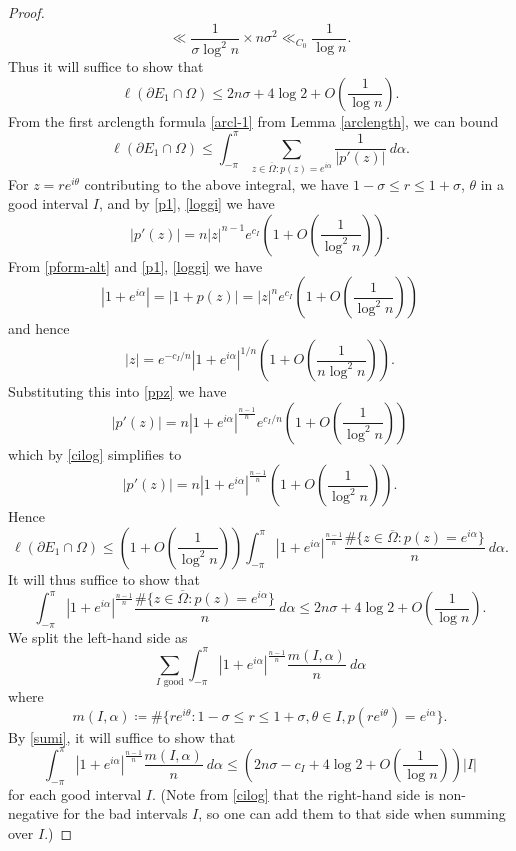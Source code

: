 \documentclass[12pt]{amsart}
\begin{document}
\begin{proof}
$$\ll  \frac{1}{\sigma \log^2 n} \times n \sigma^2 \ll_{C_0} \frac{1}{\log n}.$$
Thus it will suffice to show that
$$ \ell(\partial E_1 \cap \Omega) \leq 2n \sigma + 4 \log 2 + O\left(\frac{1}{\log n} \right).$$
From the first arclength formula \eqref{arcl-1} from Lemma \ref{arclength}, we can bound
$$ \ell(\partial E_1 \cap \Omega) \leq \int_{-\pi}^{\pi} \sum_{z \in \overline{\Omega}: p(z) = e^{i\alpha}} \frac{1}{|p'(z)|} \ d\alpha.$$
For $z = re^{i\theta}$ contributing to the above integral, we have $1-\sigma \leq r \leq 1+\sigma$, $\theta$ in a good interval $I$, and by \eqref{p1}, \eqref{loggi} we have
\begin{equation}\label{ppz}
 |p'(z)| = n |z|^{n-1} e^{c_I} \left( 1 + O\left( \frac{1}{\log^2 n} \right) \right).
\end{equation}
From \eqref{pform-alt} and \eqref{p1}, \eqref{loggi} we have
$$ |1+e^{i\alpha}| = |1+p(z)| = |z|^n e^{c_I} \left( 1 + O\left( \frac{1}{\log^2 n} \right) \right)$$
and hence
\begin{equation}\label{zi}
 |z| = e^{-c_I/n} |1 + e^{i\alpha}|^{1/n} \left( 1 + O\left( \frac{1}{n \log^2 n} \right) \right).
\end{equation}
Substituting this into \eqref{ppz} we have
$$ |p'(z)| = n |1 + e^{i\alpha}|^{\frac{n-1}{n}} e^{c_I/n} \left( 1 + O\left( \frac{1}{\log^2 n} \right) \right)$$
which by \eqref{cilog} simplifies to
$$ |p'(z)| = n |1 + e^{i\alpha}|^{\frac{n-1}{n}} \left( 1 + O\left( \frac{1}{\log^2 n} \right) \right).$$
Hence
$$ \ell(\partial E_1 \cap \Omega) \leq \left(1 + O\left( \frac{1}{\log^2 n} \right)\right) \int_{-\pi}^{\pi} |1 + e^{i\alpha}|^{\frac{n-1}{n}} \frac{\# \{ z \in \overline{\Omega}: p(z) = e^{i\alpha} \}}{n} \ d\alpha.$$
It will thus suffice to show that
$$ \int_{-\pi}^{\pi} |1 + e^{i\alpha}|^{\frac{n-1}{n}} \frac{\# \{ z \in \overline{\Omega}: p(z) = e^{i\alpha} \}}{n} \ d\alpha \leq 2n\sigma + 4 \log 2 + O\left( \frac{1}{\log n} \right).$$
We split the left-hand side as
$$ \sum_{I \text{ good}} \int_{-\pi}^\pi |1 + e^{i\alpha}|^{\frac{n-1}{n}} \frac{m(I,\alpha)}{n} \ d\alpha$$
where
$$ m(I,\alpha) \coloneqq \# \{ re^{i\theta}: 1-\sigma \leq r \leq 1+\sigma, \theta \in I, p(re^{i\theta}) = e^{i\alpha} \}.$$
By \eqref{sumi}, it will suffice to show that
$$ \int_{-\pi}^\pi |1 + e^{i\alpha}|^{\frac{n-1}{n}} \frac{m(I,\alpha)}{n} \ d\alpha
\leq \left(2n\sigma - c_I + 4 \log 2 + O\left( \frac{1}{\log n} \right)\right) |I|$$
for each good interval $I$.
(Note from \eqref{cilog} that the right-hand side is non-negative for the bad intervals $I$, so one can add them to that side when summing over $I$.)


\end{proof}
\end{document}
